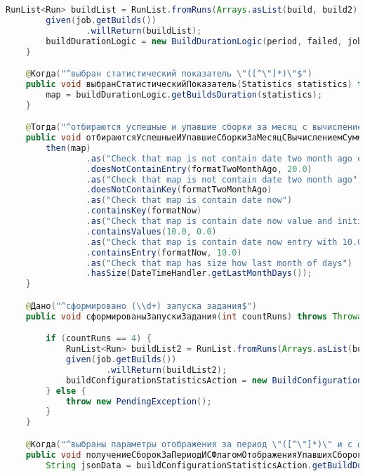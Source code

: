 \begin{lstlisting}[language=Java]
        RunList<Run> buildList = RunList.fromRuns(Arrays.asList(build, build2));
        given(job.getBuilds())
                .willReturn(buildList);
        buildDurationLogic = new BuildDurationLogic(period, failed, job.getBuilds());
    }

    @Когда("^выбран статистический показатель \"([^\"]*)\"$")
    public void выбранСтатистическийПоказатель(Statistics statistics) throws Throwable {
        map = buildDurationLogic.getBuildsDuration(statistics);
    }

    @Тогда("^отбираются успешные и упавшие сборки за месяц с вычислением суммарного времени$")
    public void отбираютсяУспешныеИУпавшиеСборкиЗаМесяцСВычислениемСуммарногоВремени() throws Throwable {
        then(map)
                .as("Check that map is not contain date two month ago entry with 20.0 time build duration")
                .doesNotContainEntry(formatTwoMonthAgo, 20.0)
                .as("Check that map is not contain date two month ago")
                .doesNotContainKey(formatTwoMonthAgo)
                .as("Check that map is contain date now")
                .containsKey(formatNow)
                .as("Check that map is contain date now value and initial values")
                .containsValues(10.0, 0.0)
                .as("Check that map is contain date now entry with 10.0 time build duration")
                .containsEntry(formatNow, 10.0)
                .as("Check that map has size how last month of days")
                .hasSize(DateTimeHandler.getLastMonthDays());
    }

    @Дано("^сформировано (\\d+) запуска задания$")
    public void сформированыЗапускиЗадания(int countRuns) throws Throwable {

        if (countRuns == 4) {
            RunList<Run> buildList2 = RunList.fromRuns(Arrays.asList(build, build2, build3, build4));
            given(job.getBuilds())
                    .willReturn(buildList2);
            buildConfigurationStatisticsAction = new BuildConfigurationStatisticsAction(job);
        } else {
            throw new PendingException();
        }
    }

    @Когда("^выбраны параметры отображения за период \"([^\"]*)\" и с флагом отображения упавших сборок \"([^\"]*)\" и статистический показатель \"([^\"]*)\"$")
    public void получениеСборокЗаПериодИСФлагомОтображенияУпавшихСборокПоПоказателю(String period, String failed, String statistics) throws Throwable {
        String jsonData = buildConfigurationStatisticsAction.getBuildDuration(period, failed, statistics);


\end{lstlisting}
